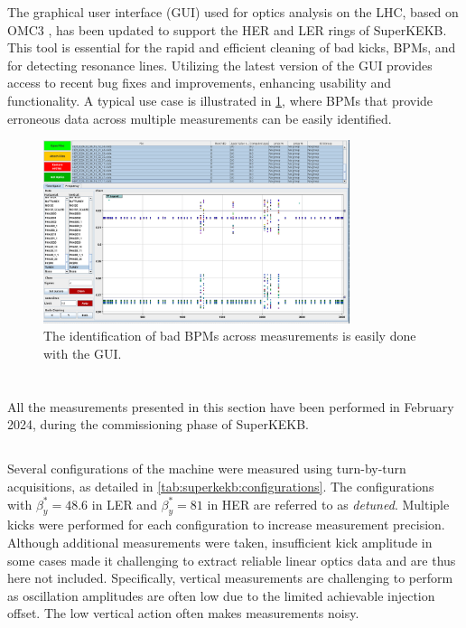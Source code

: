 The graphical user interface (GUI) used for optics analysis on the LHC, based on OMC3
\cite{omc-team_omc3_2021}, has been updated to support the HER and LER rings of SuperKEKB. This tool
is essential for the rapid and efficient cleaning of bad kicks, BPMs, and for detecting resonance
lines. Utilizing the latest version of the GUI provides access to recent bug fixes and improvements,
enhancing usability and functionality. A typical use case is illustrated in
\cref{fig:kek:gui_bad_bpms}, where BPMs that provide erroneous data across multiple measurements can
be easily identified.

\begin{figure}[!htb]
    \centering
    \includegraphics[width=0.8\textwidth]{./images/kek/GUIbadbpm.png}
    \caption{The identification of bad BPMs across measurements is easily done with the GUI.}
    \label{fig:kek:gui_bad_bpms}
\end{figure}



\FloatBarrier
\section{}

All the measurements presented in this section have been performed in February 2024, during the
commissioning phase of SuperKEKB.

\subsection{}

Several configurations of the machine were measured using turn-by-turn acquisitions, as detailed in
\cref{tab:superkekb:configurations}. The configurations with $\beta_y^* = 48.6$ in LER and
$\beta_y^* = 81$ in HER are referred to as \textit{detuned}. Multiple kicks were performed for each
configuration to increase measurement precision. Although additional measurements were taken,
insufficient kick amplitude in some cases made it challenging to extract reliable linear optics
data and are thus here not included. Specifically, vertical measurements are challenging to perform
as oscillation amplitudes are often low due to the limited achievable injection offset. The low 
vertical action often makes measurements noisy.


